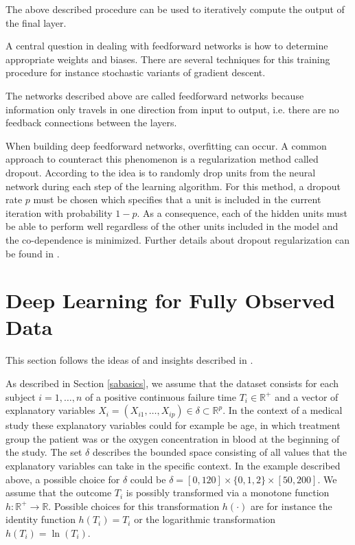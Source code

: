\documentclass[12pt, a4paper]{scrartcl}
\theoremstyle{definition}
\theoremstyle{plain}
\numberwithin{equation}{section}
\numberwithin{figure}{section}
\numberwithin{table}{section}
\begin{document}
	The above described procedure can be used to iteratively compute the output of the final layer.
	
	A central question in dealing with feedforward networks is how to determine appropriate weights and biases.
	There are several techniques for this training procedure for instance stochastic variants of gradient descent.
	
	The networks described above are called feedforward networks because information only travels in one direction from input to output, i.e. there are no feedback connections between the layers.
	
	When building deep feedforward networks, overfitting can occur.
	A common approach to counteract this phenomenon is a regularization method called dropout.
	According to \citet*{dropout} the idea is to randomly drop units from the neural network during each step of the learning algorithm.
	For this method, a dropout rate $p$ must be chosen which specifies that a unit is included in the current iteration with probability $1-p$.
	As a consequence, each of the hidden units must be able to perform well regardless of the other units included in the model and the co-dependence is minimized.
	Further details about dropout regularization can be found in \citet*{dropout}.
	
	
	\newpage
	
	\section{Deep Learning for Fully Observed Data} \label{uncensored}
	This section follows the ideas of \citet*{basearticle} and insights described in \citet*{deeplbook}.
	
	As described in Section \ref{sabasics}, we assume that the dataset consists for each subject $i = 1,\dots,n$ of a positive continuous failure time $T_i \in \mathbb{R}^+$ and a vector of explanatory variables $X_i = (X_{i1}, \dots , X_{ip}) \in \delta \subset \mathbb{R}^p$.
	In the context of a medical study these explanatory variables could for example be age, in which treatment group the patient was or the oxygen concentration in blood at the beginning of the study.
	The set $\delta$ describes the bounded space consisting of all values that the explanatory variables can take in the specific context.
	In the example described above, a possible choice for $\delta$ could be $\delta = [0, 120] \times \{0,1,2\} \times [50, 200]$.
	We assume that the outcome $T_i$ is possibly transformed via a monotone function $h: \mathbb{R}^+ \rightarrow \mathbb{R}$.
	Possible choices for this transformation $h(\cdot)$ are for instance the identity function $h(T_i)=T_i$ or the logarithmic transformation $h(T_i)= \ln (T_i)$.
	
\end{document}
